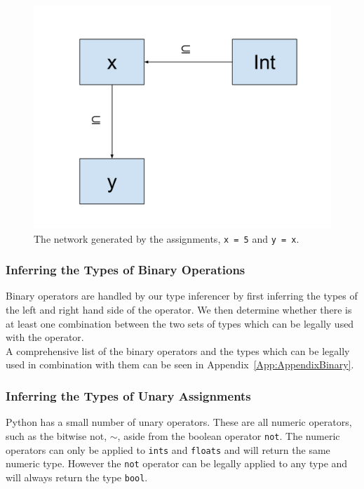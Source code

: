 \documentclass[12pt, titlepage]{article}
\begin{document}
\begin{figure}
\centering
\includegraphics[scale=0.3]{images/assignment_constraint.pdf}
\caption{The network generated by the assignments, \texttt{x = 5} and \texttt{y = x}.}
\label{fig:assignConstraint}
\end{figure}

\subsubsection{Inferring the Types of Binary Operations}
Binary operators are handled by our type inferencer by first inferring the types of the left and right hand side of the operator. We then determine whether there is at least one combination between the two sets of types which can be legally used with the operator. \\
\indent A comprehensive list of the binary operators and the types which can be legally used in combination with them can be seen in Appendix~\ref{App:AppendixBinary}.


\subsubsection{Inferring the Types of Unary Assignments}
Python has a small number of unary operators. These are all numeric operators, such as the bitwise not, $\sim$, aside from the boolean operator \texttt{not}. The numeric operators can only be applied to \texttt{ints} and \texttt{floats} and will return the same numeric type. However the \texttt{not} operator can be legally applied to any type and will always return the type \texttt{bool}.
\end{document}
